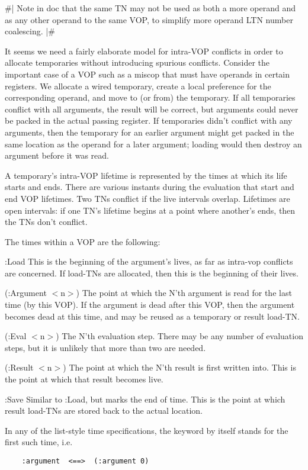 \#|
Note in doc that the same TN may not be used as both a more operand and as any
other operand to the same VOP, to simplify more operand LTN number coalescing.
|\#

It seems we need a fairly elaborate model for intra-VOP conflicts in order to
allocate temporaries without introducing spurious conflicts.  Consider the
important case of a VOP such as a miscop that must have operands in certain
registers.  We allocate a wired temporary, create a local preference for the
corresponding operand, and move to (or from) the temporary.  If all temporaries
conflict with all arguments, the result will be correct, but arguments could
never be packed in the actual passing register.  If temporaries didn't conflict
with any arguments, then the temporary for an earlier argument might get packed
in the same location as the operand for a later argument; loading would then
destroy an argument before it was read.

A temporary's intra-VOP lifetime is represented by the times at which its life
starts and ends.  There are various instants during the evaluation that start
and end VOP lifetimes.  Two TNs conflict if the live intervals overlap.
Lifetimes are open intervals: if one TN's lifetime begins at a point where
another's ends, then the TNs don't conflict.

The times within a VOP are the following:

:Load
    This is the beginning of the argument's lives, as far as intra-vop
    conflicts are concerned.  If load-TNs are allocated, then this is the
    beginning of their lives.

(:Argument $<$n$>$)
    The point at which the N'th argument is read for the last time (by this
    VOP).  If the argument is dead after this VOP, then the argument becomes
    dead at this time, and may be reused as a temporary or result load-TN.

(:Eval $<$n$>$)
    The N'th evaluation step.  There may be any number of evaluation steps, but
    it is unlikely that more than two are needed.

(:Result $<$n$>$) 
    The point at which the N'th result is first written into.  This is the
    point at which that result becomes live.

:Save
    Similar to :Load, but marks the end of time.  This is the point at which result
    load-TNs are stored back to the actual location.

In any of the list-style time specifications, the keyword by itself stands for
the first such time, i.e.
\begin{verbatim}
    :argument  <==>  (:argument 0)
\end{verbatim}

